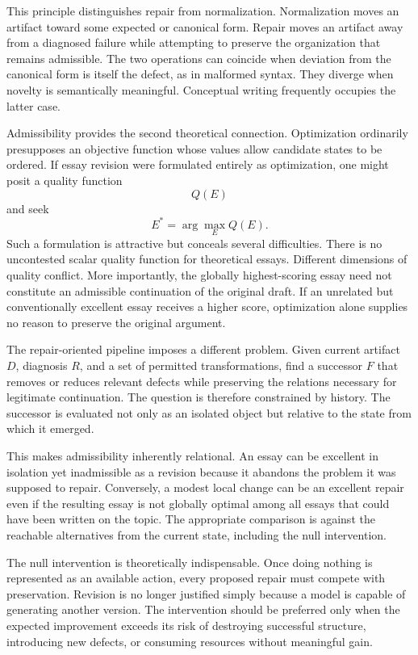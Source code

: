 \documentclass[11pt]{article}
\begin{document}
This principle distinguishes repair from normalization. Normalization moves an artifact toward some expected or canonical form. Repair moves an artifact away from a diagnosed failure while attempting to preserve the organization that remains admissible. The two operations can coincide when deviation from the canonical form is itself the defect, as in malformed syntax. They diverge when novelty is semantically meaningful. Conceptual writing frequently occupies the latter case.

Admissibility provides the second theoretical connection. Optimization ordinarily presupposes an objective function whose values allow candidate states to be ordered. If essay revision were formulated entirely as optimization, one might posit a quality function
\[
    Q(E)
\]
and seek
\[
    E^\ast=\arg\max_E Q(E).
\]
Such a formulation is attractive but conceals several difficulties. There is no uncontested scalar quality function for theoretical essays. Different dimensions of quality conflict. More importantly, the globally highest-scoring essay need not constitute an admissible continuation of the original draft. If an unrelated but conventionally excellent essay receives a higher score, optimization alone supplies no reason to preserve the original argument.

The repair-oriented pipeline imposes a different problem. Given current artifact \(D\), diagnosis \(R\), and a set of permitted transformations, find a successor \(F\) that removes or reduces relevant defects while preserving the relations necessary for legitimate continuation. The question is therefore constrained by history. The successor is evaluated not only as an isolated object but relative to the state from which it emerged.

This makes admissibility inherently relational. An essay can be excellent in isolation yet inadmissible as a revision because it abandons the problem it was supposed to repair. Conversely, a modest local change can be an excellent repair even if the resulting essay is not globally optimal among all essays that could have been written on the topic. The appropriate comparison is against the reachable alternatives from the current state, including the null intervention.

The null intervention is theoretically indispensable. Once doing nothing is represented as an available action, every proposed repair must compete with preservation. Revision is no longer justified simply because a model is capable of generating another version. The intervention should be preferred only when the expected improvement exceeds its risk of destroying successful structure, introducing new defects, or consuming resources without meaningful gain.
\end{document}

